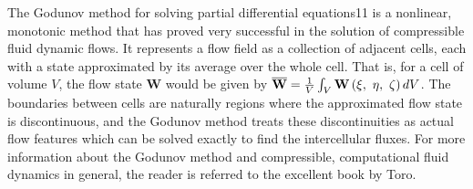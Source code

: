 The Godunov method for solving partial differential equations11 is a nonlinear, monotonic method that has proved very successful in the solution of compressible fluid dynamic flows. It represents a flow field as a collection of adjacent cells, each with a state approximated by its average over the whole cell. That is, for a cell of volume $V$, the flow state {\bf W} would be given by 
$\overline {\bf{W}}  = \frac{1}{V}\int_V {{\bf{W}}\left( {\xi ,\,\,\eta ,\,\,\zeta } \right)dV} $. 
The boundaries between cells are naturally regions where the approximated flow state is discontinuous, and the Godunov method treats these discontinuities as actual flow features which can be solved exactly to find the intercellular fluxes. For more information about the Godunov method and compressible, computational fluid dynamics in general, the reader is referred to the excellent book by Toro\cite{Toro2009}.

